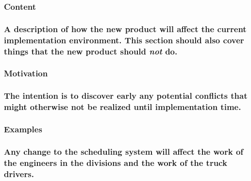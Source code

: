 \documentclass[
]{article}
\begin{document}
\hypertarget{content-64}{%
\subsubsection{Content}\label{content-64}}

\hypertarget{a-description-of-how-the-new-product-will-affect-the-current-implementation-environment.-this-section-should-also-cover-things-that-the-new-product-should-not-do.}{%
\subsubsection{\texorpdfstring{A description of how the new product will
affect the current implementation environment. This section should also
cover things that the new product should \emph{not} do.
}{A description of how the new product will affect the current implementation environment. This section should also cover things that the new product should not do. }}\label{a-description-of-how-the-new-product-will-affect-the-current-implementation-environment.-this-section-should-also-cover-things-that-the-new-product-should-not-do.}}

\hypertarget{motivation-63}{%
\subsubsection{Motivation}\label{motivation-63}}

\hypertarget{the-intention-is-to-discover-early-any-potential-conflicts-that-might-otherwise-not-be-realized-until-implementation-time.}{%
\subsubsection{\texorpdfstring{The intention is to discover early any
potential conflicts that might otherwise not be realized until
implementation time.
}{The intention is to discover early any potential conflicts that might otherwise not be realized until implementation time. }}\label{the-intention-is-to-discover-early-any-potential-conflicts-that-might-otherwise-not-be-realized-until-implementation-time.}}

\hypertarget{examples-42}{%
\subsubsection{Examples}\label{examples-42}}

\hypertarget{any-change-to-the-scheduling-system-will-affect-the-work-of-the-engineers-in-the-divisions-and-the-work-of-the-truck-drivers.}{%
\subsubsection{Any change to the scheduling system will affect the work
of the engineers in the divisions and the work of the truck
drivers.}\label{any-change-to-the-scheduling-system-will-affect-the-work-of-the-engineers-in-the-divisions-and-the-work-of-the-truck-drivers.}}
\end{document}
